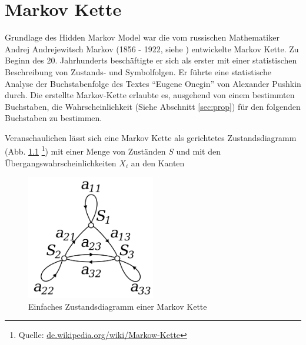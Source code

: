 \chapter{Markov Kette} 
\label{mainsec:mk}
Grundlage des Hidden Markov Model war die vom russischen Mathematiker Andrej Andrejewitsch Markov 
(1856 - 1922, siehe \cite{markov1913}) entwickelte Markov Kette. Zu Beginn des 20. Jahrhunderts beschäftigte er sich als erster mit einer statistischen Beschreibung von Zustands- und Symbolfolgen. Er führte eine statistische Analyse der Buchstabenfolge des Textes ``Eugene Onegin'' von Alexander Pushkin durch. Die erstellte Markov-Kette erlaubte es, ausgehend von einem bestimmten Buchstaben, die Wahrscheinlichkeit (Siehe Abschnitt \ref{sec:prop}) für den folgenden Buchstaben zu bestimmen. 

Veranschaulichen lässt sich eine Markov Kette als gerichtetes Zustandsdiagramm (Abb. \ref{fig:simple_mc} \footnote{Quelle: \url{de.wikipedia.org/wiki/Markow-Kette}}) mit einer Menge von Zuständen \(S\) und 
mit den Übergangswahrscheinlichkeiten \(X_i\) an den Kanten
\begin{figure}[htbp] \centering
    \includegraphics[width=0.5\textwidth]{Bilder/Kap2/simple_mc.png}
    \caption{Einfaches Zustandsdiagramm einer Markov Kette}
    \label{fig:simple_mc}
\end{figure}


